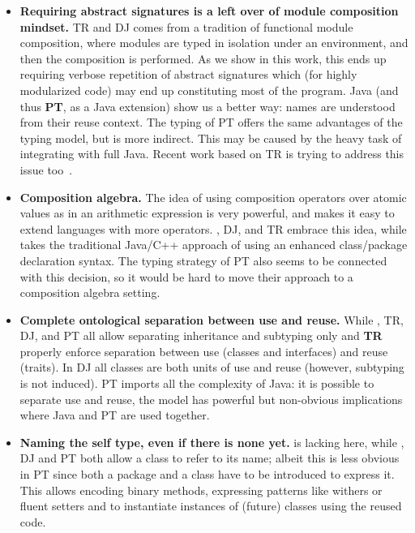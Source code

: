 \begin{itemize}
\item 
{\bf Requiring abstract signatures is a left over of module composition mindset.}
TR and DJ comes from a tradition of functional module composition, where 
modules are typed in isolation under an environment, and then the composition is performed.
As we show in this work, this ends up requiring verbose repetition of abstract signatures
which (for highly modularized code) may end up constituting most of the program.
Java (and thus \textbf{PT}, as a Java extension) show us a better way:
names are understood from their reuse context.
The typing of PT offers the same advantages of the \name typing model, 
but is more indirect. This may be caused by the
heavy task of integrating with full Java.
Recent work based on TR is trying to address this issue too~\cite{damiani2017unified}.
\item {\bf Composition algebra.}
The idea of using composition operators over atomic values as in an arithmetic expression is very powerful,
and makes it easy to extend languages with more operators. \name, DJ, and TR embrace this idea, while  takes the traditional Java/C++ approach of using an enhanced class/package declaration syntax.
The typing strategy of PT also seems to be connected with this
decision, so it would be hard to move their approach
to a composition algebra setting.
\item {\bf Complete ontological separation between use and reuse.}
While \name, TR, DJ, and PT all allow separating inheritance and subtyping only \name and \textbf{TR} properly enforce 
separation between use (classes and interfaces) and reuse (traits).
In DJ all classes are both units of use and reuse (however, subtyping is not induced).
PT imports all the complexity of Java: it is possible to separate use and reuse, the model has powerful but non-obvious implications where Java \Q@extends@ and PT are used together.
\item {\bf Naming the self type, even if there is none yet.}
 is lacking here, while \name, DJ and PT both allow a class to refer to its name; albeit this is
less obvious in PT since both a package and a class have to be introduced to express it.
This allows encoding binary methods, expressing patterns like withers or fluent setters and to instantiate instances of (future) classes  using the reused code.
\end{itemize}
\saveSpace
